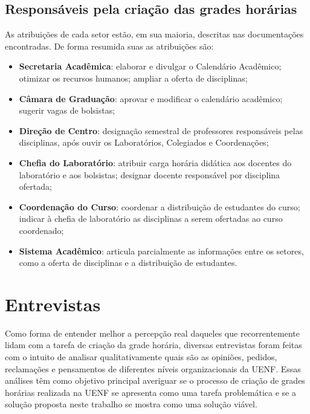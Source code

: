 \subsection{Responsáveis pela criação das grades horárias} \label{ssec:responsaveis} %

As atribuições de cada setor estão, em sua maioria, descritas nas documentações encontradas. De forma resumida suas as atribuições são:

\begin{itemize}
  \item \textbf{Secretaria Acadêmica}: elaborar e divulgar o Calendário Acadêmico; otimizar os recursos humanos; ampliar a oferta de disciplinas;
  \item \textbf{Câmara de Graduação}: aprovar e modificar o calendário acadêmico; sugerir vagas de bolsistas;
  \item \textbf{Direção de Centro}: designação semestral de professores responsáveis pelas disciplinas, após ouvir os Laboratórios, Colegiados e Coordenações;
  \item \textbf{Chefia do Laboratório}: atribuir carga horária didática aos docentes do laboratório e aos bolsistas; designar docente responsável por disciplina ofertada;
  \item \textbf{Coordenação do Curso}: coordenar a distribuição de estudantes do curso; indicar à chefia de laboratório as disciplinas a serem ofertadas ao curso coordenado;
  \item \textbf{Sistema Acadêmico}: articula parcialmente as informações entre os setores, como a oferta de disciplinas e a distribuição de estudantes.
\end{itemize}

\section{Entrevistas} \label{sec:entrevistas} %


Como forma de entender melhor a percepção real daqueles que recorrentemente lidam com a tarefa de criação da grade horária, diversas entrevistas foram feitas com o intuito de analisar qualitativamente quais são as opiniões, pedidos, reclamações e pensamentos de diferentes níveis organizacionais da UENF. Essas análises têm como objetivo principal averiguar se o processo de criação de grades horárias realizada na UENF se apresenta como uma tarefa problemática e se a solução proposta neste trabalho se mostra como uma solução viável.

